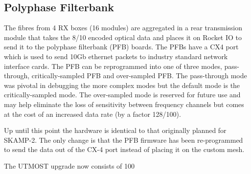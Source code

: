 \subsection{Polyphase Filterbank}
The fibres from 4 RX boxes (16 modules) are aggregated in a rear transmission module that takes the 8/10 encoded optical data and places it on Rocket IO to send it to the polyphase filterbank (PFB) boards. The PFBs have a CX4 port which is used to send 10Gb ethernet packets to industry standard network interface cards. The PFB can be reprogrammed into one of three modes, pass-through, critically-sampled PFB and over-sampled PFB. The pass-through mode was pivotal in debugging the more complex modes but the default mode is the critically-sampled mode. The over-sampled mode is reserved for future use and may help eliminate the loss of sensitivity between frequency channels but comes at the cost of an increased data rate (by a factor 128/100). 

Up until this point the hardware is identical to that originally planned for SKAMP-2. The only change is that the PFB firmware has been re-programmed to send the data out of the CX-4 port instead of placing it on the custom mesh.

The UTMOST upgrade now consists of 100%